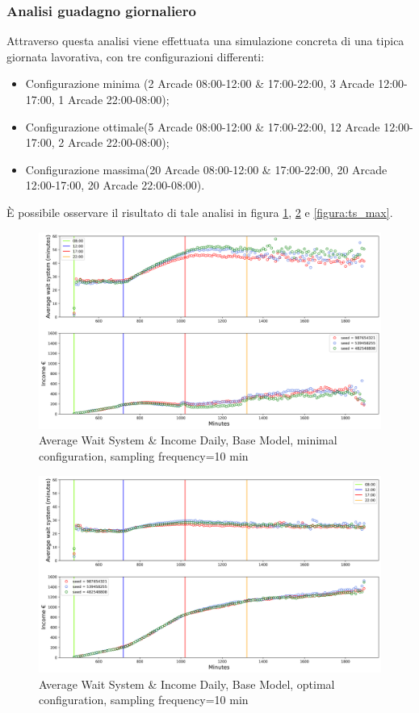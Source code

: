 \documentclass{article}
\begin{document}
\subsubsection{Analisi guadagno giornaliero}
Attraverso questa analisi viene effettuata una simulazione concreta di una tipica giornata lavorativa, con tre configurazioni differenti:
\begin{itemize}
	\item Configurazione minima (2 Arcade 08:00-12:00 \& 17:00-22:00, 3 Arcade 12:00-17:00, 1 Arcade 22:00-08:00);
	\item Configurazione ottimale(5 Arcade 08:00-12:00 \& 17:00-22:00, 12 Arcade 12:00-17:00, 2 Arcade 22:00-08:00);
	\item Configurazione massima(20 Arcade 08:00-12:00 \& 17:00-22:00, 20 Arcade 12:00-17:00, 20 Arcade 22:00-08:00).
\end{itemize} 
È possibile osservare il risultato di tale analisi in figura \ref{figura:ts_min}, \ref{figura:ts_optimal} e \ref{figura:ts_max}.
\begin{figure}[H]
	\centering
	\captionsetup{justification=centering,margin=2cm}
	\includegraphics[scale=0.48]{images/ts_min.png}
	\caption{Average Wait System \& Income Daily, Base Model, minimal configuration, sampling frequency=10 min}\label{figura:ts_min}
\end{figure}
\begin{figure}[H]
	\centering
	\captionsetup{justification=centering,margin=2cm}
	\includegraphics[scale=0.48]{images/ts_optimal.png}
	\caption{Average Wait System \& Income Daily, Base Model, optimal configuration, sampling frequency=10 min}\label{figura:ts_optimal}
\end{figure}
\end{document}
